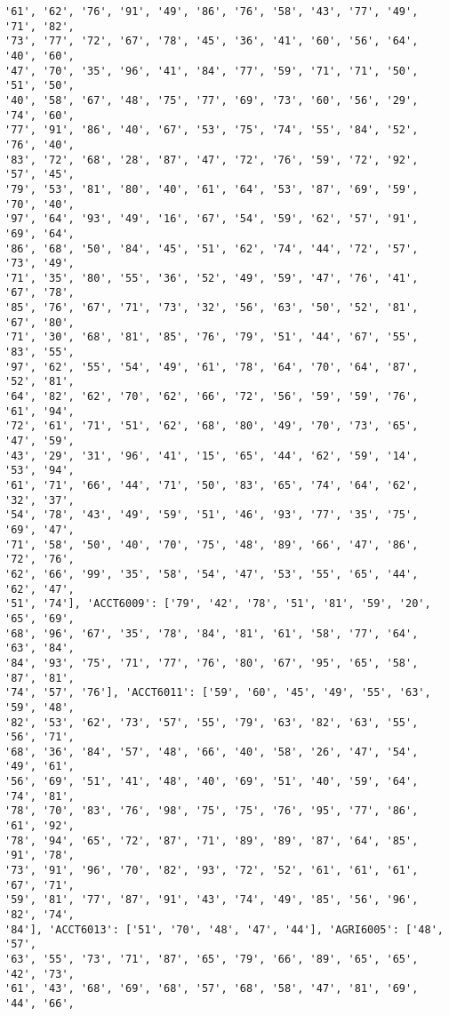 \documentclass[11pt]{article}
\begin{document}
\begin{Verbatim}[commandchars=\\\{\}]
'61', '62', '76', '91', '49', '86', '76', '58', '43', '77', '49', '71', '82',
'73', '77', '72', '67', '78', '45', '36', '41', '60', '56', '64', '40', '60',
'47', '70', '35', '96', '41', '84', '77', '59', '71', '71', '50', '51', '50',
'40', '58', '67', '48', '75', '77', '69', '73', '60', '56', '29', '74', '60',
'77', '91', '86', '40', '67', '53', '75', '74', '55', '84', '52', '76', '40',
'83', '72', '68', '28', '87', '47', '72', '76', '59', '72', '92', '57', '45',
'79', '53', '81', '80', '40', '61', '64', '53', '87', '69', '59', '70', '40',
'97', '64', '93', '49', '16', '67', '54', '59', '62', '57', '91', '69', '64',
'86', '68', '50', '84', '45', '51', '62', '74', '44', '72', '57', '73', '49',
'71', '35', '80', '55', '36', '52', '49', '59', '47', '76', '41', '67', '78',
'85', '76', '67', '71', '73', '32', '56', '63', '50', '52', '81', '67', '80',
'71', '30', '68', '81', '85', '76', '79', '51', '44', '67', '55', '83', '55',
'97', '62', '55', '54', '49', '61', '78', '64', '70', '64', '87', '52', '81',
'64', '82', '62', '70', '62', '66', '72', '56', '59', '59', '76', '61', '94',
'72', '61', '71', '51', '62', '68', '80', '49', '70', '73', '65', '47', '59',
'43', '29', '31', '96', '41', '15', '65', '44', '62', '59', '14', '53', '94',
'61', '71', '66', '44', '71', '50', '83', '65', '74', '64', '62', '32', '37',
'54', '78', '43', '49', '59', '51', '46', '93', '77', '35', '75', '69', '47',
'71', '58', '50', '40', '70', '75', '48', '89', '66', '47', '86', '72', '76',
'62', '66', '99', '35', '58', '54', '47', '53', '55', '65', '44', '62', '47',
'51', '74'], 'ACCT6009': ['79', '42', '78', '51', '81', '59', '20', '65', '69',
'68', '96', '67', '35', '78', '84', '81', '61', '58', '77', '64', '63', '84',
'84', '93', '75', '71', '77', '76', '80', '67', '95', '65', '58', '87', '81',
'74', '57', '76'], 'ACCT6011': ['59', '60', '45', '49', '55', '63', '59', '48',
'82', '53', '62', '73', '57', '55', '79', '63', '82', '63', '55', '56', '71',
'68', '36', '84', '57', '48', '66', '40', '58', '26', '47', '54', '49', '61',
'56', '69', '51', '41', '48', '40', '69', '51', '40', '59', '64', '74', '81',
'78', '70', '83', '76', '98', '75', '75', '76', '95', '77', '86', '61', '92',
'78', '94', '65', '72', '87', '71', '89', '89', '87', '64', '85', '91', '78',
'73', '91', '96', '70', '82', '93', '72', '52', '61', '61', '61', '67', '71',
'59', '81', '77', '87', '91', '43', '74', '49', '85', '56', '96', '82', '74',
'84'], 'ACCT6013': ['51', '70', '48', '47', '44'], 'AGRI6005': ['48', '57',
'63', '55', '73', '71', '87', '65', '79', '66', '89', '65', '65', '42', '73',
'61', '43', '68', '69', '68', '57', '68', '58', '47', '81', '69', '44', '66',

\end{Verbatim}
\end{document}
